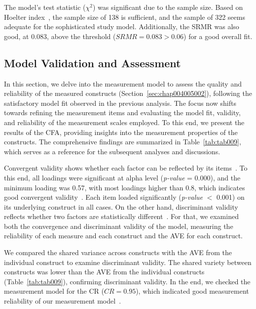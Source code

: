 The model's test statistic ($\chi^2$) was significant due to the sample size.
Based on Hoelter index~\cite{https://doi.org/10.1002/nur.20088}, the sample size of 138 is sufficient, and the sample of 322 seems adequate for the sophisticated study model.
Additionally, the \ac{SRMR} was also good, at 0.083, above the threshold ($SRMR = 0.083 > 0.06$) for a good overall fit.

\subsection{Model Validation and Assessment}
\label{chap:app003004002}

In this section, we delve into the measurement model to assess the quality and reliability of the measured constructs (Section~\ref{sec:chap004005002}), following the satisfactory model fit observed in the previous analysis.
The focus now shifts towards refining the measurement items and evaluating the model fit, validity, and reliability of the measurement scales employed.
To this end, we present the results of the \ac{CFA}, providing insights into the measurement properties of the constructs.
The comprehensive findings are summarized in Table~\ref{tab:tab009}, which serves as a reference for the subsequent analyses and discussions.



Convergent validity shows whether each factor can be reflected by its items~\cite{10.3389/fpubh.2018.00149, Henseler2015}.
To this end, all loadings were significant at alpha level ({\it p-value} = 0.000), and the minimum loading was 0.57, with most loadings higher than 0.8, which indicates good convergent validity~\cite{info:doi/10.2196/14316}.
Each item loaded significantly ({\it p-value} $<$ 0.001) on its underlying construct in all cases.
On the other hand, discriminant validity reflects whether two factors are statistically different~\cite{10.3389/fpubh.2018.00149, Henseler2015}.
For that, we examined both the convergence and discriminant validity of the model, measuring the reliability of each measure and each construct and the \ac{AVE} for each construct.

We compared the shared variance across constructs with the \ac{AVE} from the individual construct to examine discriminant validity.
The shared variety between constructs was lower than the \ac{AVE} from the individual constructs (Table~\ref{tab:tab009}), confirming discriminant validity.
In the end, we checked the measurement model for the \acl{CR} ($CR = 0.95$), which indicated good measurement reliability of our measurement model~\cite{Bagozzi2012, doi:10.1504/IJMDA.2017.087624, murtagh2012multivariate, SUMAK2016602}.

